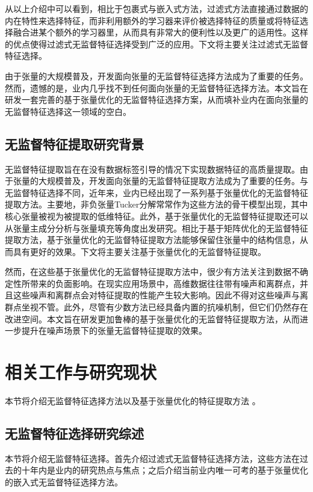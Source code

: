 从以上介绍中可以看到，相比于包裹式与嵌入式方法，过滤式方法直接通过数据的内在特性来选择特征，而非利用额外的学习器来评价被选择特征的质量或将特征选择融合进某个额外的学习器里，从而具有非常大的便利性以及更广的适用性。这样的优点使得过滤式无监督特征选择受到广泛的应用。下文将主要关注过滤式无监督特征选择。

由于张量的大规模普及，开发面向张量的无监督特征选择方法成为了重要的任务。然而，遗憾的是，业内几乎找不到任何面向张量的无监督特征选择方法。本文旨在研发一套完善的基于张量优化的无监督特征选择方案，从而填补业内在面向张量的无监督特征选择这一领域的空白。

\subsection{无监督特征提取研究背景}
无监督特征提取旨在在没有数据标签引导的情况下实现数据特征的高质量提取。由于张量的大规模普及，开发面向张量的无监督特征提取方法成为了重要的任务。与无监督特征选择不同，近年来，业内已经出现了一系列基于张量优化的无监督特征提取方法。主要地，非负张量Tucker分解常常作为这些方法的骨干模型出现，其中核心张量被视为被提取的低维特征。此外，基于张量优化的无监督特征提取还可以从张量主成分分析与张量填充等角度出发研究。相比于基于矩阵优化的无监督特征提取方法，基于张量优化的无监督特征提取方法能够保留住张量中的结构信息，从而具有更好的效果。下文将主要关注基于张量优化的无监督特征提取。

然而，在这些基于张量优化的无监督特征提取方法中，很少有方法关注到数据不确定性所带来的负面影响。在现实应用场景中，高维数据往往带有噪声和离群点，并且这些噪声和离群点会对特征提取的性能产生较大影响。因此不得对这些噪声与离群点坐视不管。此外，尽管有少数方法已经具备内置的抗噪机制，但它们仍然存在改进空间。本文旨在研发更加鲁棒的基于张量优化的无监督特征提取方法，从而进一步提升在噪声场景下的张量无监督特征提取的效果。

\section{相关工作与研究现状}
本节将介绍无监督特征选择方法以及基于张量优化的特征提取方法
。
\subsection{无监督特征选择研究综述}\label{sec:review-ufs}
本节将介绍无监督特征选择。首先介绍过滤式无监督特征选择方法，这些方法在过去的十年内是业内的研究热点与焦点；之后介绍当前业内唯一可考的基于张量优化的嵌入式无监督特征选择方法。

